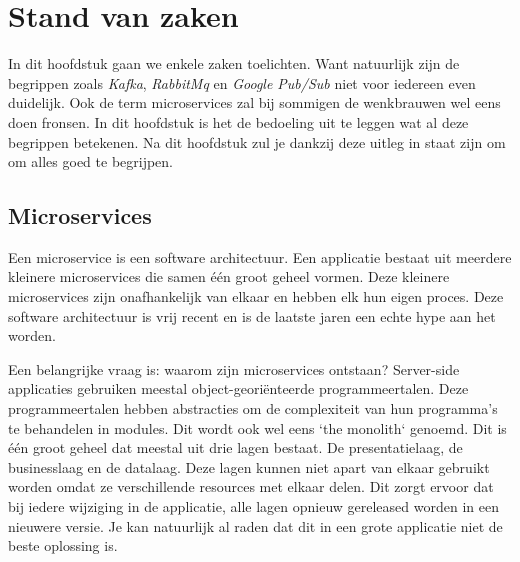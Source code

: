 \chapter{Stand van zaken}
\label{ch:stand-van-zaken}

In dit hoofdstuk gaan we enkele zaken toelichten. Want natuurlijk zijn de begrippen zoals \emph{Kafka}, \emph{RabbitMq} en \emph{Google Pub/Sub} niet voor iedereen even duidelijk. Ook de term microservices zal bij sommigen de wenkbrauwen wel eens doen fronsen. In dit hoofdstuk is het de bedoeling uit te leggen wat al deze begrippen betekenen. Na dit hoofdstuk zul je dankzij deze uitleg in staat zijn om om alles goed te begrijpen.
\section{Microservices}

Een microservice is een software architectuur. Een applicatie bestaat uit meerdere kleinere microservices die samen één groot geheel vormen. Deze kleinere microservices zijn onafhankelijk van elkaar en hebben elk hun eigen proces. Deze software architectuur is vrij recent en is de laatste jaren een echte hype aan het worden.

Een belangrijke vraag is: waarom zijn microservices ontstaan? Server-side applicaties gebruiken meestal object-georiënteerde programmeertalen. Deze programmeertalen hebben abstracties om de complexiteit van hun programma's te behandelen in modules. Dit wordt ook wel eens `the monolith` genoemd. Dit is één groot geheel dat meestal uit drie lagen bestaat. De presentatielaag, de businesslaag en de datalaag. Deze lagen kunnen niet apart van elkaar gebruikt worden omdat ze verschillende resources met elkaar delen. Dit zorgt ervoor dat bij iedere wijziging in de applicatie, alle lagen opnieuw gereleased worden in een nieuwere versie. Je kan natuurlijk al raden dat dit in een grote applicatie niet de beste oplossing is. 

